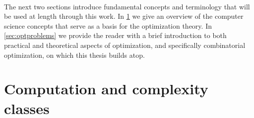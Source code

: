 %
%

\paragraph{}
\paragraph{}
The next two sections introduce fundamental concepts and terminology that will be used at length through this work.
In \cref{sec:compandcomp} we give an overview of the computer science concepts that serve as a basis for the optimization theory.
In \cref{sec:optproblems} we provide the reader with a brief introduction to both practical and theoretical aspects of optimization, and specifically combinatorial optimization, on which this thesis builds atop.

\section{Computation and complexity classes}
\label{sec:compandcomp}

